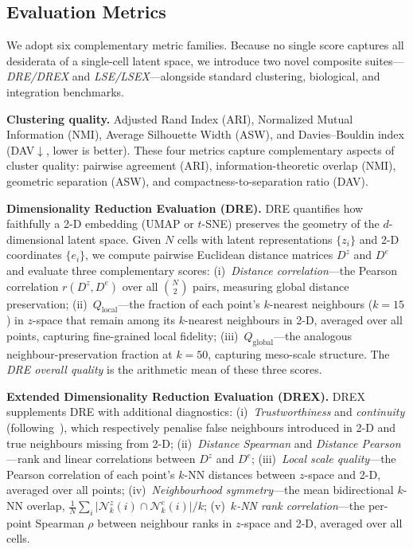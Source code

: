 \documentclass[preprint,12pt,number]{elsarticle}
\begin{document}
\subsection{Evaluation Metrics}
\label{sec:experiments:metrics}

We adopt six complementary metric families. Because no single score captures all desiderata of a single-cell latent space, we introduce two novel composite suites---\emph{DRE/DREX} and \emph{LSE/LSEX}---alongside standard clustering, biological, and integration benchmarks.

\textbf{Clustering quality.} Adjusted Rand Index (ARI), Normalized Mutual Information (NMI), Average Silhouette Width (ASW), and Davies--Bouldin index (DAV$\downarrow$, lower is better). These four metrics capture complementary aspects of cluster quality: pairwise agreement (ARI), information-theoretic overlap (NMI), geometric separation (ASW), and compactness-to-separation ratio (DAV).

\textbf{Dimensionality Reduction Evaluation (DRE).}
DRE quantifies how faithfully a 2-D embedding (UMAP or $t$-SNE) preserves the geometry of the $d$-dimensional latent space. Given $N$ cells with latent representations $\{z_i\}$ and 2-D coordinates $\{e_i\}$, we compute pairwise Euclidean distance matrices $D^{z}$ and $D^{e}$ and evaluate three complementary scores:
(i)~\emph{Distance correlation}---the Pearson correlation $r(D^{z}, D^{e})$ over all $\binom{N}{2}$ pairs, measuring global distance preservation;
(ii)~$Q_{\mathrm{local}}$---the fraction of each point's $k$-nearest neighbours ($k{=}15$) in $z$-space that remain among its $k$-nearest neighbours in 2-D, averaged over all points, capturing fine-grained local fidelity;
(iii)~$Q_{\mathrm{global}}$---the analogous neighbour-preservation fraction at $k{=}50$, capturing meso-scale structure.
The \emph{DRE overall quality} is the arithmetic mean of these three scores.

\textbf{Extended Dimensionality Reduction Evaluation (DREX).}
DREX supplements DRE with additional diagnostics:
(i)~\emph{Trustworthiness} and \emph{continuity} (following~\cite{venna2006local}), which respectively penalise false neighbours introduced in 2-D and true neighbours missing from 2-D;
(ii)~\emph{Distance Spearman} and \emph{Distance Pearson}---rank and linear correlations between $D^{z}$ and $D^{e}$;
(iii)~\emph{Local scale quality}---the Pearson correlation of each point's $k$-NN distances between $z$-space and 2-D, averaged over all points;
(iv)~\emph{Neighbourhood symmetry}---the mean bidirectional $k$-NN overlap, $\frac{1}{N}\sum_{i}\lvert\mathcal{N}^{z}_{k}(i)\cap\mathcal{N}^{e}_{k}(i)\rvert / k$;
(v)~\emph{$k$-NN rank correlation}---the per-point Spearman $\rho$ between neighbour ranks in $z$-space and 2-D, averaged over all cells.
\end{document}
